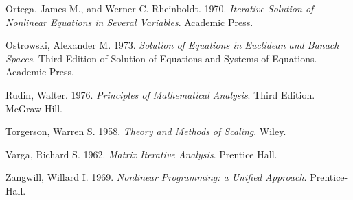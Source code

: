 \documentclass[
  12pt,
  letterpaper,
  DIV=11,
  numbers=noendperiod]{scrartcl}
\newlength{\cslhangindent}
\newenvironment{CSLReferences}[2] %
 {\begin{list}{}{%
  \setlength{\itemindent}{0pt}
  \setlength{\leftmargin}{0pt}
  \setlength{\parsep}{0pt}
  \ifodd #1
   \setlength{\leftmargin}{\cslhangindent}
   \setlength{\itemindent}{-1\cslhangindent}
  \fi
  \setlength{\itemsep}{#2\baselineskip}}}
 {\end{list}}
\begin{document}
\begin{CSLReferences}{1}{1}
Ortega, James M., and Werner C. Rheinboldt. 1970. \emph{{Iterative
Solution of Nonlinear Equations in Several Variables}}. Academic Press.

Ostrowski, Alexander M. 1973. \emph{Solution of Equations in Euclidean
and Banach Spaces}. Third Edition of Solution of Equations and Systems
of Equations. Academic Press.

Rudin, Walter. 1976. \emph{Principles of Mathematical Analysis}. Third
Edition. McGraw-Hill.

Torgerson, Warren S. 1958. \emph{{Theory and Methods of Scaling}}.
Wiley.

Varga, Richard S. 1962. \emph{{Matrix Iterative Analysis}}. Prentice
Hall.

Zangwill, Willard I. 1969. \emph{{Nonlinear Programming: a Unified
Approach}}. Prentice-Hall.

\end{CSLReferences}
\end{document}
